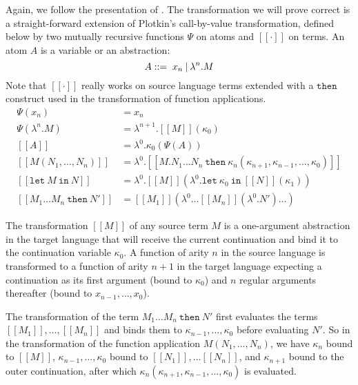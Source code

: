 \documentclass[a4paper,11pt,draft]{article}
\newcommand{\kw}[1]{\mathtt{#1}}
\begin{document}
Again, we follow the presentation of \cite{Dargaye-Leroy-07}.
The transformation we will prove correct is a straight-forward extension of
Plotkin's call-by-value transformation, defined below by two mutually
recursive functions $\Psi$ on atoms and $[\![\cdot]\!]$ on terms. An atom $A$
is a variable or an abstraction:
\begin{equation*}
A ::= \; x_{n} \: \text{\textbar} \: \lambda^{n}.M
\end{equation*}
Note that $[\![\cdot]\!]$ really works on source language terms extended with
a $\kw{then}$ construct used in the transformation of function applications.
\begin{align*}
\Psi(x_{n}) &=
  x_{n} \\
\Psi(\lambda^{n}.M) &=
  \lambda^{n+1}.[\![M]\!](\kappa_{0}) \\[1em]
[\![A]\!] &=
  \lambda^{0}.\kappa_{0} (\Psi(A)) \\
[\![M(N_{1}, \ldots, N_{n})]\!] &=
  \lambda^{0}.[\![M . N_{1} \ldots N_{n} \: \kw{then} \:
  \kappa_{n}(\kappa_{n+1}, \kappa_{n-1}, \ldots, \kappa_{0})]\!] \\
[\![\kw{let} \: M \: \kw{in} \: N]\!] &=
  \lambda^{0}.[\![M]\!] (\lambda^{0}.\kw{let} \:
  \kappa_{0} \: \kw{in} \: [\![N]\!] (\kappa_{1})) \\
[\![M_{1} \ldots M_{n} \: \kw{then} \: N']\!] &=
  [\![M_{1}]\!] (\lambda^{0} \ldots [\![M_{n}]\!] (\lambda^{0}.N') \ldots )
\end{align*}

The transformation $[\![M]\!]$ of any source term $M$ is a one-argument
abstraction in the target language that will receive the current continuation
and bind it to the continuation variable $\kappa_{0}$. A function of arity $n$
in the source language is transformed to a function of arity $n+1$ in the
target language expecting a continuation as its first argument (bound
to $\kappa_{0}$) and $n$ regular arguments thereafter
(bound to $x_{n-1}, \ldots, x_{0}$).

The transformation of the term $M_{1} \ldots M_{n} \: \kw{then} \: N'$ first
evaluates the terms
$[\![M_{1}]\!], \ldots, [\![M_{n}]\!]$ and binds them to
$\kappa_{n-1}, \ldots, \kappa_{0}$ before evaluating $N'$. So in the
transformation of the function application
$M(N_{1}, \ldots, N_{n})$, we have $\kappa_{n}$ bound to $[\![M]\!]$,
$\kappa_{n-1}, \ldots, \kappa_{0}$ bound to $[\![N_{1}]\!], \ldots [\![N_{n}]\!]$,
and $\kappa_{n+1}$ bound to the outer continuation, after which
$\kappa_{n}(\kappa_{n+1}, \kappa_{n-1}, \ldots, \kappa_{0})$ is evaluated.
\end{document}
